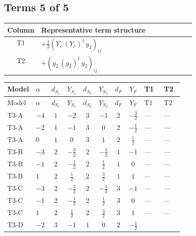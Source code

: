 \documentclass[8pt]{article}
\begin{document}
\begin{landscape}
\subsection*{Terms 5 of 5}
\begin{center}
\begin{tabular}{@{}c >{\raggedright\arraybackslash}p{0.82\linewidth}@{}}
\toprule
Column & Representative term structure \\
\midrule
T1 & \(\displaystyle +\frac{1}{2} \left({Y_e}\,\left({Y_e}\right)^{\dagger}\,{y_2}\right)_{ij}\) \\
\midrule
T2 & \(\displaystyle +\left({y_2}\,\left({y_2}\right)^{\dagger}\,{y_2}\right)_{ij}\) \\
\midrule
\bottomrule
\end{tabular}
\end{center}
\smallskip
\tiny
\begin{longtable}{@{}llcccccc >{\raggedright\arraybackslash}p{0.21\linewidth} >{\raggedright\arraybackslash}p{0.21\linewidth}@{}}
\toprule
Model & $\alpha$ & $d_{S_1}$ & $Y_{S_1}$ & $d_{S_2}$ & $Y_{S_2}$ & $d_F$ & $Y_F$ & T1 & T2 \\
\midrule
\endfirsthead
\toprule
Model & $\alpha$ & $d_{S_1}$ & $Y_{S_1}$ & $d_{S_2}$ & $Y_{S_2}$ & $d_F$ & $Y_F$ & T1 & T2 \\
\midrule
\endhead
T3-A & $-4$ & $1$ & $-2$ & $3$ & $-1$ & $2$ & $-\frac{3}{2}$ & --- & --- \\
\midrule
T3-A & $-2$ & $1$ & $-1$ & $3$ & $0$ & $2$ & $-\frac{1}{2}$ & --- & --- \\
\midrule
T3-A & $0$ & $1$ & $0$ & $3$ & $1$ & $2$ & $\frac{1}{2}$ & --- & --- \\
\midrule
T3-B & $-3$ & $2$ & $-\frac{3}{2}$ & $2$ & $-\frac{1}{2}$ & $1$ & $-1$ & --- & --- \\
\midrule
T3-B & $-1$ & $2$ & $-\frac{1}{2}$ & $2$ & $\frac{1}{2}$ & $1$ & $0$ & --- & --- \\
\midrule
T3-B & $1$ & $2$ & $\frac{1}{2}$ & $2$ & $\frac{3}{2}$ & $1$ & $1$ & --- & --- \\
\midrule
T3-C & $-3$ & $2$ & $-\frac{3}{2}$ & $2$ & $-\frac{1}{2}$ & $3$ & $-1$ & --- & --- \\
\midrule
T3-C & $-1$ & $2$ & $-\frac{1}{2}$ & $2$ & $\frac{1}{2}$ & $3$ & $0$ & --- & --- \\
\midrule
T3-C & $1$ & $2$ & $\frac{1}{2}$ & $2$ & $\frac{3}{2}$ & $3$ & $1$ & --- & --- \\
\midrule
T3-D & $-2$ & $3$ & $-1$ & $1$ & $0$ & $2$ & $-\frac{1}{2}$ & \scriptsize\adjustbox{max width=\linewidth}{$\begin{gathered} +\frac{1}{2} \left({Y_e}\,\left({Y_e}\right)^{\dagger}\,{y_2}\right)_{ij}\end{gathered}$} & \scriptsize\adjustbox{max width=\linewidth}{$\begin{gathered} +\left({y_2}\,\left({y_2}\right)^{\dagger}\,{y_2}\right)_{ij}\end{gathered}$} \\

\end{longtable}
\end{landscape}
\end{document}
